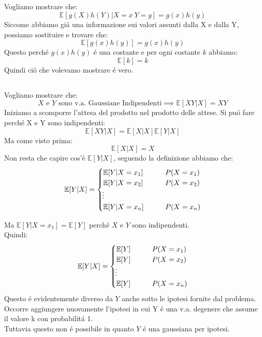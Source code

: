 \documentclass[a4paper]{article}
\newcommand{\E}[0]{\mathbb{E}}
\begin{document}
\subsection{}
Vogliamo mostrare che:
$$
\E[g(X)h(Y) | X = x \ Y = y] = g(x)h(y)
$$
Siccome abbiamo giá una informazione sui valori assunti dalla X e dalla Y, possiamo sostituire e trovare che:
$$
\E[g(x)h(y)] = g(x)h(y)
$$
Questo perché $g(x)h(y)$ é una costante e per ogni costante $k$ abbiamo:
$$
\E[k] = k
$$
Quindi ció che volevamo mostrare é vero.

\subsection{}
Vogliamo mostrare che:
$$
X \text{ e } Y \text{ sono v.a. Gaussiane Indipendenti} \implies \E[XY | X] = XY
$$
Iniziamo a scomporre l'attesa del prodotto nel prodotto delle attese. Si puó fare perché X e Y sono indipendenti:
$$
\E[XY | X] = \E[X | X]\E[Y | X]
$$
Ma come visto prima:
$$
\E[X | X] = X
$$
Non resta che capire cos'é $\E[Y | X]$, seguendo la definizione abbiamo che:
\begin{align}
	\E[Y | X]=
	\begin{cases}
		\E[Y | X = x_1] \qquad & P(X=x_1)\\
		\E[Y | X = x_2] \qquad & P(X=x_2)\\
        \vdotswithin{} \notag \\
		\E[Y | X = x_n] \qquad & P(X=x_n)\\
	\end{cases}
\end{align}

Ma $\E[Y | X = x_1] = \E[Y]$ perché $X$ e $Y$ sono indipendenti.\\
Quindi:
\begin{align}
	\E[Y | X]=
	\begin{cases}
		\E[Y] \qquad & P(X=x_1)\\
		\E[Y] \qquad & P(X=x_2)\\
        \vdotswithin{} \notag \\
		\E[Y] \qquad & P(X=x_n)\\
	\end{cases}
\end{align}
Questo é evidentemente diverso da $Y$ anche sotto le ipotesi fornite dal problema.\\
Occorre aggiungere nuovamente l'ipotesi in cui Y é una v.a. degenere che assume il valore k con probabilitá 1.\\
Tuttavia questo non é possibile in quanto $Y$ é una gaussiana per ipotesi.
\end{document}
